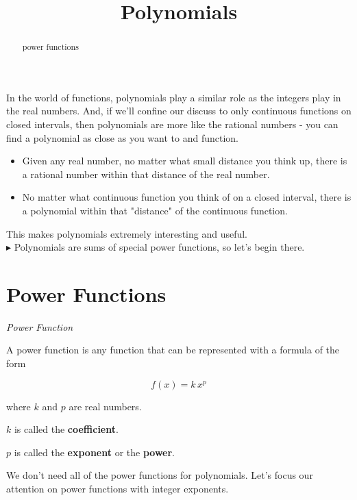 \documentclass{ximera}
\title{Polynomials}
\begin{document}
\begin{abstract}
power functions
\end{abstract}
\maketitle


In the world of functions, polynomials play a similar role as the integers play in the real numbers. And, if we'll confine our discuss to only continuous functions on closed intervals, then polynomials are more like the rational numbers - you can find a polynomial as close as you want to and function.

\begin{itemize}
\item Given any real number, no matter what small distance you think up, there is a rational number within that distance of the real number.

\item No matter what continuous function you think of on a closed interval, there is a polynomial within that "distance" of the continuous function.
\end{itemize}

This makes polynomials extremely interesting and useful. \\


$\blacktriangleright$ Polynomials are sums of special power functions, so let's begin there.



\section{Power Functions}

\begin{definition} \textit{Power Function}

A power function is any function that can be represented with a formula of the form

\[   f(x) = k \, x^p      \]

where $k$ and $p$ are real numbers.

$k$ is called the \textbf{coefficient}.

$p$ is called the \textbf{exponent} or the \textbf{power}.


\end{definition}
We don't need all of the power functions for polynomials.  Let's focus our attention on power functions with integer exponents. \\
\end{document}
